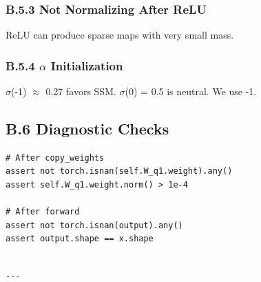 \subsubsection{B.5.3 Not Normalizing After ReLU}

ReLU can produce sparse maps with very small mass.

\subsubsection{B.5.4 $\alpha$ Initialization}

$\sigma$(-1) $\approx$ 0.27 favors SSM. $\sigma$(0) = 0.5 is neutral. We use -1.

\subsection{B.6 Diagnostic Checks}

\begin{lstlisting}
# After copy_weights
assert not torch.isnan(self.W_q1.weight).any()
assert self.W_q1.weight.norm() > 1e-4

# After forward
assert not torch.isnan(output).any()
assert output.shape == x.shape
\end{lstlisting}
\begin{lstlisting}

---
\end{lstlisting}